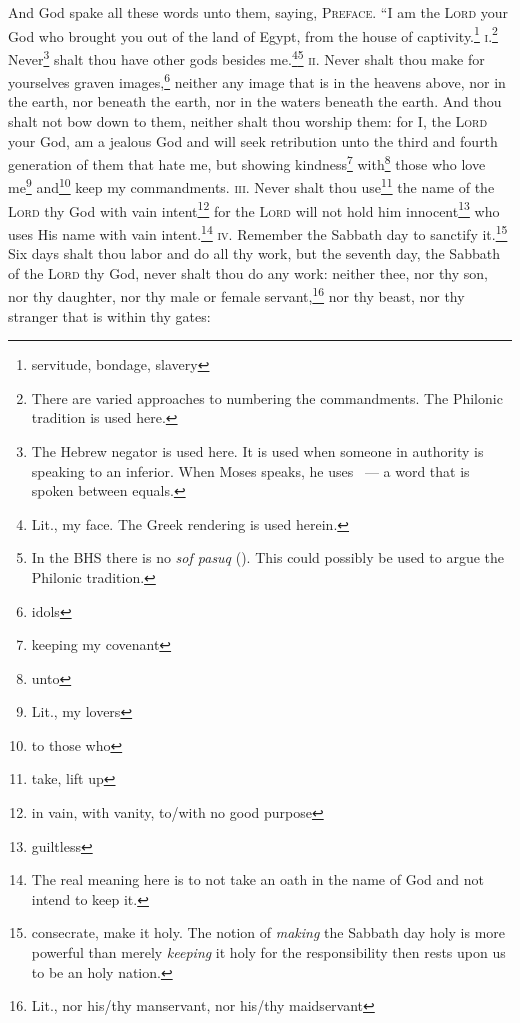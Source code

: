 \begin{enumerate}[align=center]
     And God spake all these words unto them, saying,%
     \textsc{Preface.} ``I am the \textsc{Lord} your God who brought you out of the land of Egypt, from the house of captivity.\footnote{servitude, bondage, slavery}%
     \textsc{i.}\footnote{There are varied approaches to numbering the commandments. The Philonic tradition is used here.} Never\footnote{The Hebrew negator  is used here. It is used when someone in authority is speaking to an inferior. When Moses speaks, he uses ~--- a word that is spoken between equals.} shalt thou have other gods besides me.\footnote{Lit., my face. The Greek rendering is used herein.}\footnote{In the BHS there is no \textit{sof pasuq} (). This could possibly be used to argue the Philonic tradition.}%
     \textsc{ii.} Never shalt thou make for yourselves graven images,\footnote{idols} neither any image that is in the heavens above, nor in the earth, nor beneath the earth, nor in the waters beneath the earth.%
     And thou shalt not bow down to them, neither shalt thou worship them: for I, the \textsc{Lord} your God, am a jealous God and will seek retribution unto the third and fourth generation of them that hate me,%
     but showing kindness\footnote{keeping my covenant} with\footnote{unto} those who love me\footnote{Lit., my lovers} and\footnote{to those who} keep my commandments.%
     \textsc{iii.} Never shalt thou use\footnote{take, lift up} the name of the \textsc{Lord} thy God with vain intent\footnote{in vain, with vanity, to/with no good purpose} for the \textsc{Lord} will not hold him innocent\footnote{guiltless} who uses His name with vain intent.\footnote{The real meaning here is to not take an oath in the name of God and not intend to keep it.}%
     \textsc{iv.} Remember the Sabbath day to sanctify it.\footnote{consecrate, make it holy. The notion of \emph{making} the Sabbath day holy is more powerful than merely \emph{keeping} it holy for the responsibility then rests upon us to be an holy nation.}%
     Six days shalt thou labor and do all thy work,%
     but the seventh day, the Sabbath of the \textsc{Lord} thy God, never shalt thou do any work: neither thee, nor thy son, nor thy daughter, nor thy male or female servant,\footnote{Lit., nor his/thy manservant, nor his/thy maidservant} nor thy beast, nor thy stranger that is within thy gates:%

\end{enumerate}

